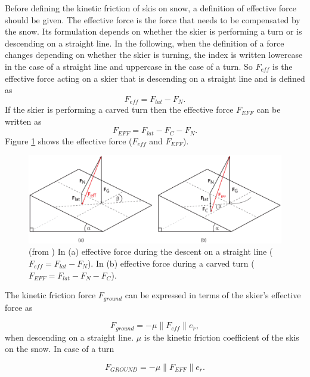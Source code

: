 \documentclass[12pt,a4paper,twoside]{book}
\newcommand{\norm}[1]{\lVert#1\rVert}
\begin{document}
Before defining the kinetic friction of skis on snow, a definition of effective force should be given. The effective force is the force that needs to be compensated by the snow. Its formulation depends on whether the skier is performing a turn or is descending on a straight line. In the following, when the definition of a force changes depending on whether the skier is turning, the index is written lowercase in the case of a straight line and uppercase in the case of a turn. So $F_{eff}$ is the effective force acting on a skier that is descending on a straight line and is defined as
\begin{equation}
F_{eff}=F_{lat}-F_N.
\end{equation}
If the skier is performing a carved turn then the effective force $F_{EFF}$ can be written as
\begin{equation}
F_{EFF}=F_{lat}-F_C-F_N.
\end{equation}
Figure \ref{effective_force_pic} shows the effective force ($F_{eff}$ and $F_{EFF}$).

\begin{figure}
  \begin{center}
    \includegraphics[width=\textwidth]{images/figure6.eps}
    \caption{(from \cite{hol2012}) In (a) effective force during the descent on a straight line ($F_{eff}=F_{lat}-F_N$). In (b) effective force during a carved turn ($F_{EFF}=F_{lat}-F_N-F_C$).}\label{effective_force_pic}
  \end{center}
\end{figure}

The kinetic friction force $F_{ground}$ can be expressed in terms of the skier's effective force as

\begin{equation}
F_{ground}=-\mu \norm{F_{eff}}e_{\dot{r}},
\end{equation}
when descending on a straight line. $\mu$ is the kinetic friction coefficient of the skis on the snow. In case of a turn

\begin{equation}
F_{GROUND}=-\mu \norm{F_{EFF}}e_{\dot{r}}.
\end{equation}
\end{document}
